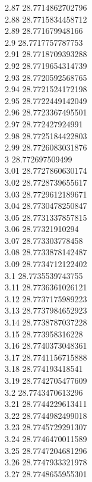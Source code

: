{2.87	28.7714862702796\\
2.88	28.7715834458712\\
2.89	28.771679948166\\
2.9	28.7717757787753\\
2.91	28.7718709393288\\
2.92	28.7719654314739\\
2.93	28.7720592568765\\
2.94	28.7721524172198\\
2.95	28.7722449142049\\
2.96	28.7723367495501\\
2.97	28.772427924991\\
2.98	28.7725184422803\\
2.99	28.7726083031876\\
3	28.772697509499\\
3.01	28.7727860630174\\
3.02	28.7728739655617\\
3.03	28.7729612189671\\
3.04	28.7730478250847\\
3.05	28.7731337857815\\
3.06	28.77321910294\\
3.07	28.773303778458\\
3.08	28.7733878142487\\
3.09	28.7734712122402\\
3.1	28.7735539743755\\
3.11	28.7736361026121\\
3.12	28.7737175989223\\
3.13	28.7737984652923\\
3.14	28.7738787037228\\
3.15	28.773958316228\\
3.16	28.7740373048361\\
3.17	28.7741156715888\\
3.18	28.774193418541\\
3.19	28.7742705477609\\
3.2	28.7743470613296\\
3.21	28.7744229613411\\
3.22	28.7744982499018\\
3.23	28.7745729291307\\
3.24	28.7746470011589\\
3.25	28.7747204681296\\
3.26	28.7747933321978\\
3.27	28.7748655955301\\
}
